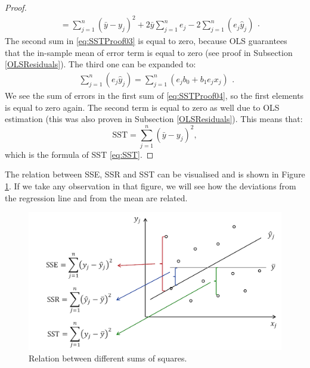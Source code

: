 \documentclass[
]{book}
\theoremstyle{definition}
\theoremstyle{definition}
\theoremstyle{definition}
\theoremstyle{definition}
\theoremstyle{remark}
\begin{document}
\begin{proof}
\begin{equation}
\begin{aligned}
        &= \sum_{j=1}^n (\bar{y} - y_j)^2 + 2 \bar{y} \sum_{j=1}^n e_j - 2 \sum_{j=1}^n \left(e_j \hat{y}_j \right)
    \end{aligned} .
    \label{eq:SSTProof03}
\end{equation}
The second sum in \eqref{eq:SSTProof03} is equal to zero, because OLS guarantees that the in-sample mean of error term is equal to zero (see proof in Subsection \ref{OLSResiduals}). The third one can be expanded to:
\begin{equation}
    \begin{aligned}
        \sum_{j=1}^n \left(e_j \hat{y}_j \right) = \sum_{j=1}^n \left(e_j b_0 + b_1 e_j x_j \right)
    \end{aligned} .
    \label{eq:SSTProof04}
\end{equation}
We see the sum of errors in the first sum of \eqref{eq:SSTProof04}, so the first elements is equal to zero again. The second term is equal to zero as well due to OLS estimation (this was also proven in Subsection \ref{OLSResiduals}). This means that:
\begin{equation}
    \mathrm{SST} =  \sum_{j=1}^n (\bar{y} - y_j)^2 ,
    \label{eq:SSTProof05}
\end{equation}
which is the formula of SST \eqref{eq:SST}.
\end{proof}

The relation between SSE, SSR and SST can be visualised and is shown in Figure \ref{fig:sumsSquaredRelation}. If we take any observation in that figure, we will see how the deviations from the regression line and from the mean are related.

\begin{figure}
\includegraphics[width=16.81in]{images/09-SLR-SSE-white} \caption{Relation between different sums of squares.}\label{fig:sumsSquaredRelation}
\end{figure}
\end{document}
